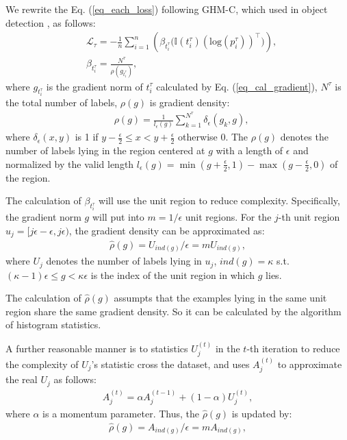 \documentclass[11pt,a4paper]{article}
\begin{document}
We rewrite the Eq. (\ref{eq_each_loss}) following GHM-C, which used in object detection \cite{Li2019}, as follows:
\begin{align}
    &\mathcal{L}_\tau = -\frac{1}{n}\sum_{i=1}^n \left( \beta_{t_i^\tau} \big( \mathbb{I} \left(t_i^\tau \right) \left( \text{log} \left(p^\tau_i \right) \right)^\top \big) \right), \label{eq_each_weighted_loss} \\
    &\beta_{t_i^\tau} = \frac{N^\tau}{\rho\left(g_{t_i^\tau}\right)},
\end{align}
where $g_{t_i^\tau}$ is the gradient norm of $t_i^\tau$ calculated by Eq. (\ref{eq_cal_gradient}), $N^\tau$ is the total number of labels, $\rho(g)$ is gradient density:
\begin{align}
    &\rho(g)=\frac{1}{l_{\epsilon}(g)} \sum_{k=1}^{N^\tau} \delta_{\epsilon}\left(g_{k}, g\right), \label{eq_gradient_density}
\end{align}
where $\delta_{\epsilon}(x, y)$ is 1 if $y-\frac{\epsilon}{2}\leq x<y+\frac{\epsilon}{2}$ otherwise 0. The $\rho(g)$ denotes the number of labels lying in the region centered at $g$ with a length of $\epsilon$ and normalized by the valid length $l_{\epsilon}(g)=\min \left(g+\frac{\epsilon}{2}, 1\right)-\max \left(g-\frac{\epsilon}{2}, 0\right)$ of the region.

The calculation of $\beta_{t_i^\tau}$ will use the unit region to reduce complexity. Specifically, the gradient norm $g$ will put into $m={1}/{\epsilon}$ unit regions. For the $j$-th unit region $u_j=\big[j\epsilon-\epsilon, j\epsilon\big)$, the gradient density can be approximated as:
\begin{align}
    \hat{\rho}(g)=U_{ind(g)}/{\epsilon}=mU_{ind(g)}, 
\end{align}
where $U_j$ denotes the number of labels lying in $u_j$, $ind(g)=\kappa$ s.t. $(\kappa-1)\epsilon \leq g<\kappa\epsilon$ is the index of the unit region in which $g$ lies.

The calculation of $\hat{\rho}(g)$ assumpts that the examples lying in the same unit region share the same gradient density. So it
can be calculated by the algorithm of histogram statistics.

A further reasonable manner is to statistics $U_j^{(t)}$ in the $t$-th iteration to reduce the complexity of $U_j$'s statistic cross the dataset, and uses $A_j^{(t)}$ to approximate the real $U_j$ as follows:
\begin{align}
    A_j^{(t)}=\alpha A_j^{(t-1)} + (1-\alpha) U_j^{(t)}, \label{eq_momentum}
\end{align}
where $\alpha$ is a momentum parameter. Thus, the $\hat{\rho}(g)$ is updated by:
\begin{align}
    \hat{\rho}(g)={A_{ind(g)}} / {\epsilon}=mA_{ind(g)}, 
\end{align}
\end{document}
